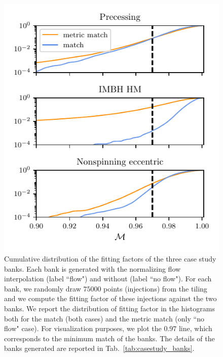 \documentclass[twocolumn,showpacs,preprintnumbers,nofootinbib,prd,
superscriptaddress,10pt]{revtex4-2}
\begin{document}
\begin{figure}[t!]
	\includegraphics{bank_injections}
	\caption{
	Cumulative distribution of the fitting factors of the three case study banks. Each bank is generated with the normalizing flow interpolation (label ``flow") and without (label ``no flow"). For each bank, we randomly draw $75000$ points (injections) from the tiling and we compute the fitting factor of these injections against the two banks. We report the distribution of fitting factor in the histograms both for the match (both cases) and the metric match (only ``no flow" case). For visualization purposes, we plot the $0.97$ line, which corresponds to the minimum match of the banks.
	The details of the banks generated are reported in Tab.~\ref{tab:casestudy_banks}.
	}
	\label{fig:bank_injections}
\end{figure}
\end{document}
